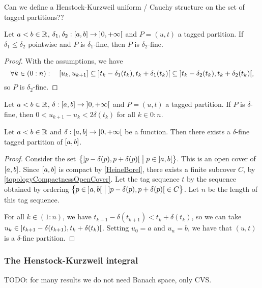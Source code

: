 Can we define a Henstock-Kurzweil uniform / Cauchy structure on the set of tagged partitions??

\begin{lemma} \label{smallerGaugeFunctionFinerPartition}
Let $a <  b\in \mathbb{R}$, $\delta_1, \delta_2: \interval{a,b}\to \interval[o]{0,+\infty}$ and $P = (u,t)$ a tagged partition. If $\delta_1 \leq \delta_2$ pointwise and $P$ is $\delta_1$-fine, then $P$ is $\delta_2$-fine.
\end{lemma}
\begin{proof}
With the assumptions, we have
\[ \forall k\in (0:n): \quad \interval{u_k, u_{k+1}} \subseteq \interval[o]{t_k-\delta_1(t_k), t_k+\delta_1(t_k)} \subseteq \interval[o]{t_k-\delta_2(t_k), t_k+\delta_2(t_k)}, \]
so $P$ is $\delta_2$-fine.
\end{proof}

\begin{lemma} \label{deltaFinePartitionWidthBound}
Let $a <  b\in \mathbb{R}$, $\delta: \interval{a,b}\to \interval[o]{0,+\infty}$ and $P = (u,t)$ a tagged partition. If $P$ is $\delta$-fine, then $0< u_{k+1}-u_k < 2\delta(t_k)$ for all $k\in 0:n$.
\end{lemma}

\begin{lemma} \label{cousinsLemma}
Let $a <  b\in \mathbb{R}$ and $\delta: \interval{a,b}\to \interval[o]{0,+\infty}$ be a function. Then there exists a $\delta$-fine tagged partition of $\interval{a,b}$.
\end{lemma}
\begin{proof}
Consider the set $\setbuilder[\big]{\interval[o]{p-\delta(p), p+\delta(p)}}{p\in \interval[o]{a,b}}$. This is an open cover of $\interval{a,b}$. Since $\interval{a,b}$ is compact by \ref{HeineBorel}, there exists a finite subcover $C$, by \ref{topologyCompactnessOpenCover}. Let the tag sequence $t$ by the sequence obtained by ordering $\setbuilder[\big]{p\in\interval[o]{a,b}}{\interval[o]{p-\delta(p), p+\delta(p)}\in C}$. Let $n$ be the length of this tag sequence.


For all $k\in (1:n)$, we have $t_{k+1}-\delta(t_{k+1}) < t_k + \delta(t_k)$, so we can take $u_{k} \in \interval[o]{t_{k+1}-\delta(t_{k+1}), t_k + \delta(t_k)}$. Setting $u_0 = a$ and $u_{n} = b$, we have that $(u,t)$ is a $\delta$-fine partition.
\end{proof}

\subsubsection{The Henstock-Kurzweil integral}
TODO: for many results we do not need Banach space, only CVS.

